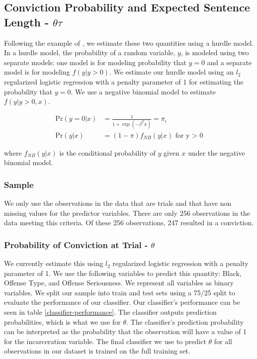 \documentclass[11pt, oneside]{article}   	%
\theoremstyle{ModifiedStyle}
\begin{document}
	\subsection{Conviction Probability and Expected Sentence Length - $\theta \tau$}
	  \label{theta-tau-estimation}

		Following the example of \cite{hester2017conditional}, we estimate these two quantities using a hurdle model. In a hurdle model, the probability of a random variable, $y$, is modeled using two separate models: one model is for modeling probability that $y=0$ and a separate model is for modeling $f(y|y>0)$. We estimate our hurdle model using an $l_2$ regularized logistic regression with a penalty parameter of 1 for estimating the probability that $y=0$. We use a negative binomial model to estimate $f(y|y>0,x)$.

		\begin{align*}
		  \text{Pr}(y=0|x) &= \frac{1}{1+\exp(-\beta^Tx)} = \pi_i\\
			\text{Pr}(y|x) &= (1-\pi) f_{NB}(y|x) \text{ for y > 0}
		\end{align*}

		where $f_{NB}(y|x)$ is the conditional probability of $y$ given $x$ under the negative binomial model.

		\subsubsection{Sample}
			We only use the observations in the data that are trials and that have non missing values for the predictor variables. There are only 256 observations in the data meeting this criteria. Of these 256 observations, 247 resulted in a conviction.

	  \subsubsection{Probability of Conviction at Trial - $\theta$}
	    \label{theta-estimation}
	    We currently estimate this using $l_2$ regularized logistic regression with a penalty parameter of 1. We use the following variables to predict this quantity: Black, Offense Type, and Offense Seriousness. We represent all variables as binary variables. We split our sample into train and test sets using a 75/25 split to evaluate the performance of our classifier. Our classifier's performance can be seen in table \ref{classifier-performance}. The classifier outputs prediction probabilities, which is what we use for $\theta$. The classifier's prediction probability can be interpreted as the probability that the observation will have a value of 1 for the incarceration variable. The final classifier we use to predict $\theta$ for all observations in our dataset is trained on the full training set.
\end{document}
